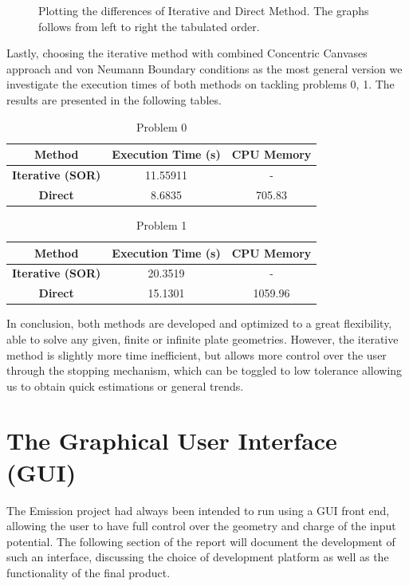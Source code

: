 \documentclass[a4paper]{article}
\begin{document}
{\begin{figure}[h]
\begin{subfigure}{0.3\textwidth}
\end{subfigure}
\caption[Optional caption for list of figures 5-8]{Plotting the differences of Iterative and Direct Method. The graphs follows from left to right the tabulated order.}
\label{fig:iterVsdir}
\end{figure}}


Lastly, choosing the iterative method with combined Concentric Canvases approach and von Neumann Boundary conditions as the most general version we investigate the execution times of both methods on tackling problems 0, 1. The results are presented in the following tables. 

\begin{table}[h!]
\centering
\begin{tabular}{c | c c }
\textbf{Method} & \textbf{Execution Time} (s) & \textbf{CPU Memory}\\
\hline
\textbf{Iterative (SOR)} &  11.55911 & - \\
\textbf{Direct} & 8.6835   &  705.83\\
\end{tabular}
\caption{Problem 0}
\end{table}

\begin{table}[h!]
\centering
\begin{tabular}{c | c c }
\textbf{Method} & \textbf{Execution Time (s)} & \textbf{CPU Memory}\\
\hline
\textbf{Iterative (SOR)} &  20.3519 & - \\
\textbf{Direct} & 15.1301  & 1059.96\\
\end{tabular}
\caption{Problem 1}
\end{table}
In conclusion, both methods are developed and optimized to a great flexibility, able to solve any given, finite or infinite plate geometries. However, the iterative method is slightly more time inefficient, but allows more control over the user through the stopping mechanism, which can be toggled to low tolerance allowing us to obtain quick estimations or general trends.



\section*{The Graphical User Interface (GUI)}
\noindent
The Emission project had always been intended to run using a GUI front end, allowing the user to have full control over the geometry and charge of the input potential. The following section of the report will document the development of such an interface, discussing the choice of development platform as well as the functionality of the final product.
\end{document}
